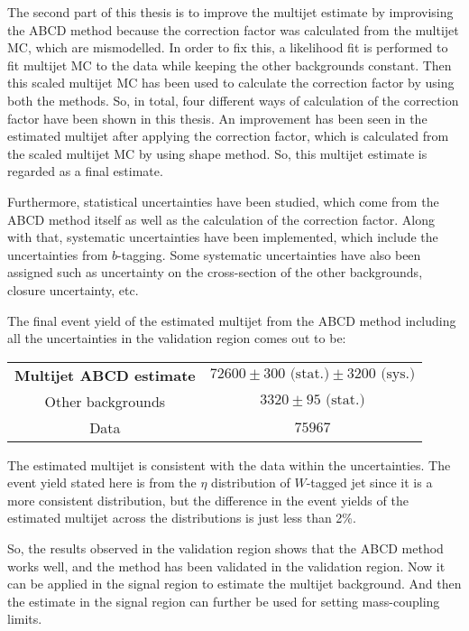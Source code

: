 The second part of this thesis is to improve the multijet estimate by improvising the ABCD method because the correction factor was calculated from the multijet MC, which are mismodelled. In order to fix this, a likelihood fit is performed to fit multijet MC to the data while keeping the other backgrounds constant. Then this scaled multijet MC has been used to calculate the correction factor by using both the methods. So, in total, four different ways of calculation of the correction factor have been shown in this thesis. An improvement has been seen in the estimated multijet after applying the correction factor, which is calculated from the scaled multijet MC by using shape method. So, this multijet estimate is regarded as a final estimate.

Furthermore, statistical uncertainties have been studied, which come from the ABCD method itself as well as the calculation of the correction factor. Along with that, systematic uncertainties have been implemented, which include the uncertainties from $b$-tagging. Some systematic uncertainties have also been assigned such as uncertainty on the cross-section of the other backgrounds, closure uncertainty, etc.

The final event yield of the estimated multijet from the ABCD method including all the uncertainties in the validation region comes out to be: 

\begin{table}[hbt!]
	\centering
	\begin{tabular}{c|c} 
		\toprule
		\textbf{Multijet ABCD estimate} & \textbf{$\num{72600} \pm \num{300} \text{ (stat.)} \pm \num{3200} \text{ (sys.)}$} \\
		Other backgrounds & $\num{3320} \pm \num{95} \text{ (stat.)}$ \\
		\midrule
		Data & $\num{75967}$ \\
		\bottomrule
	\end{tabular}
	\label{table:conclusion}
\end{table}

The estimated multijet is consistent with the data within the uncertainties. The event yield stated here is from the $\eta$ distribution of $W$-tagged jet since it is a more consistent distribution, but the difference in the event yields of the estimated multijet across the distributions is just less than 2\%.

So, the results observed in the validation region shows that the ABCD method works well, and the method has been validated in the validation region. Now it can be applied in the signal region to estimate the multijet background. And then the estimate in the signal region can further be used for setting mass-coupling limits.

